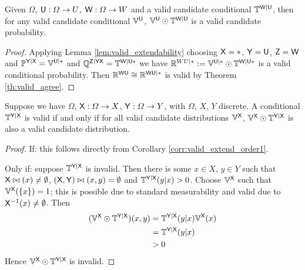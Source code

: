 \begin{corollary}\label{corr:valid_extend_order1}
Given $\Omega$, $\mathsf{U}:\Omega\to U$, $\mathsf{W}:\Omega\to W$ and a valid candidate conditional $\mathbb{T}^{\mathsf{W}|\mathsf{U}}$, then for any valid candidate conditional $\mathbb{V}^{\mathsf{U}}$, $\mathbb{V}^{\mathsf{U}}\odot \mathbb{T}^{\mathsf{W}|\mathsf{U}}$ is a valid candidate probability.
\end{corollary}

\begin{proof}
Applying Lemma \ref{lem:valid_extendability} choosing $\mathsf{X}=*$, $\mathsf{Y}=\mathsf{U}$, $\mathsf{Z}=\mathsf{W}$ and $\mathbb{P}^{\mathsf{Y}|\mathsf{X}}=\mathbb{V}^{\mathsf{U}|*}$ and $\mathbb{Q}^{\mathsf{Z}|\mathsf{YX}}=\mathbb{T}^{\mathsf{W}|\mathsf{U*}}$ we have $\mathbb{R}^{WU|*}:=\mathbb{V}^{\mathsf{U}|*}\odot \mathbb{T}^{\mathsf{W}|\mathsf{U}*}$ is a valid conditional probability. Then $\mathbb{R}^{\mathsf{WU}}\cong \mathbb{R}^{\mathsf{WU}|*}$ is valid by Theorem \ref{th:valid_agree}.
\end{proof}

\begin{theorem}\label{th:valid_conditional_probability}
Suppose we have $\Omega$, $\mathsf{X}:\Omega\to X$, $\mathsf{Y}:\Omega\to Y$, with $\Omega$, $X$, $Y$ discrete. A conditional $\mathbb{T}^{\mathsf{Y}|\mathsf{X}}$ is valid if and only if for all valid candidate distributions $\mathbb{V}^{\mathsf{X}}$, $\mathbb{V}^{\mathsf{X}}\odot \mathbb{T}^{\mathsf{Y}|\mathsf{X}}$ is also a valid candidate distribution.
\end{theorem}

\begin{proof}
If: this follows directly from Corollary \ref{corr:valid_extend_order1}.

Only if: suppose $\mathbb{T}^{\mathsf{Y}|\mathsf{X}}$ is invalid. Then there is some $x\in X$, $y\in Y$ such that $\mathsf{X}\bowtie(x)\neq \emptyset$, $(\mathsf{X},\mathsf{Y})\bowtie(x,y)=\emptyset$ and $\mathbb{T}^{\mathsf{Y}|\mathsf{X}}(y|x)>0$. Choose $\mathbb{V}^{\mathsf{X}}$ such that $\mathbb{V}^{\mathsf{X}}(\{x\})=1$; this is possible due to standard measurability and valid due to $\mathsf{X}^{-1}(x)\neq \emptyset$. Then
\begin{align}
	(\mathbb{V}^{\mathsf{X}}\odot \mathbb{T}^{\mathsf{Y}|\mathsf{X}})(x,y) &= \mathbb{T}^{\mathsf{Y}|\mathsf{X}}(y|x) \mathbb{V}^{\mathsf{X}}(x)\\
																	 &= \mathbb{T}^{\mathsf{Y}|\mathsf{X}}(y|x)\\
																	 &>0
\end{align}
Hence $\mathbb{V}^{\mathsf{X}}\odot \mathbb{T}^{\mathsf{Y}|\mathsf{X}}$ is invalid.
\end{proof}

